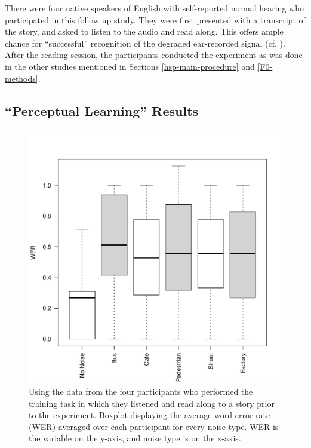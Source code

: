 \documentclass[dissertation,copyright]{uathesis}
\makeatletter
\def\maxwidth{ %
  \ifdim\Gin@nat@width>\linewidth
    \linewidth
  \else
    \Gin@nat@width
  \fi
}
\makeatother
\begin{document}
There were four native speakers of English with self-reported normal hearing who participated in this follow up study.  They were first presented with a transcript of the story, and asked to listen to the audio and read along.  This offers ample chance for ``successful'' recognition of the degraded ear-recorded signal (cf. \cite{davis:05}).  After the reading session, the participants conducted the experiment as was done in the other studies mentioned in Sections \ref{hsp-main-procedure} and \ref{F0-methods}.

\subsection{``Perceptual Learning'' Results}

\begin{figure}

\includegraphics[width=\maxwidth]{figure/perc_boxplot_noise-1} 

\caption{Using the data from the four participants who performed the training task in which they listened and read along to a story prior to the experiment.  Boxplot displaying the average word error rate (WER) averaged over each participant for every noise type. WER is the variable on the y-axis, and noise type is on the x-axis.}
\label{fig:perc_noise_boxplot}
\end{figure}
\end{document}
